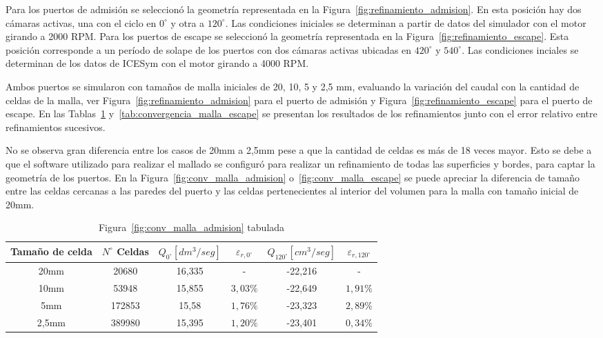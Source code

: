 Para los puertos de admisión se seleccionó la geometría representada en la
Figura~\ref{fig:refinamiento_admision}.
%
En esta posición hay dos cámaras activas, una con el ciclo en $0^{\circ}$ y
otra a $120^{\circ}$.
%
Las condiciones iniciales se determinan a partir de datos del simulador con el
motor girando a 2000 RPM.%
%
Para los puertos de escape se seleccionó la geometría representada en la
Figura~\ref{fig:refinamiento_escape}.
%
Esta posición corresponde a un período de solape de los puertos con dos cámaras
activas ubicadas en $420^{\circ}$ y $540^{\circ}$.
%
Las condiciones inciales se determinan de los datos de ICESym con el motor
girando a 4000 RPM.

Ambos puertos se simularon con tamaños de malla iniciales de 20, 10, 5 y 2,5 mm,
evaluando la variación del caudal con la cantidad de celdas de la malla, ver
Figura~\ref{fig:refinamiento_admision} para el puerto de admisión y
Figura~\ref{fig:refinamiento_escape} para el puerto de escape.
%
En las Tablas~\ref{tab:convergencia_malla_admision}
y~\ref{tab:convergencia_malla_escape} se presentan los resultados de los
refinamientos junto con el error relativo entre refinamientos sucesivos.

No se observa gran diferencia entre los casos de 20mm a 2,5mm pese a que la
cantidad de celdas es más de 18 veces mayor.
%
Esto se debe a que el software utilizado para realizar el mallado se configuró
para realizar un refinamiento de todas las superficies y bordes, para captar la
geometría de los puertos.
%
En la Figura~\ref{fig:conv_malla_admision} o~\ref{fig:conv_malla_escape} se
puede apreciar la diferencia de tamaño entre las celdas cercanas a las paredes
del puerto y las celdas pertenecientes al interior del volumen para la malla
con tamaño inicial de 20mm.

\begin{table}
  \centering
  \begin{tabular}{cccccc}\toprule
    Tamaño de celda & $N^{\circ}$ Celdas & $Q_{0^{\circ}} [dm^{3}/seg]$ & $\varepsilon_{r,0^{\circ}}$ & $Q_{120^{\circ}} [cm^{3}/seg]$ & $\varepsilon_{r,120^{\circ}}$ \\ \midrule
    20mm  & 20680  & 16,335 & -        & -22,216 & - \\
    10mm  & 53948  & 15,855 & $3,03\%$ & -22,649 & $1,91\%$ \\
    5mm   & 172853 & 15,58  & $1,76\%$ & -23,323 & $2,89\%$ \\
    2,5mm & 389980 & 15,395 & $1,20\%$ & -23,401 & $0,34\%$ \\ \bottomrule
  \end{tabular}
  \caption{Figura~\ref{fig:conv_malla_admision} tabulada}\label{tab:convergencia_malla_admision}
\end{table}

